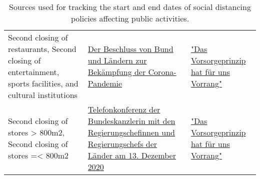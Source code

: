\begin{table}[hbt!]
{\begin{tabular}{|| L | L | L ||}
Second closing of restaurants, Second closing of entertainment, sports facilities, and cultural institutions & \href{https://www.bundesregierung.de/breg-de/suche/bund-laender-beschluss-1805264}{Der Beschluss von Bund und Ländern zur Bekämpfung der Corona-Pandemie} & \href{https://www.bundesregierung.de/breg-de/suche/bund-laender-beschluss-1841048}{"Das Vorsorgeprinzip hat für uns Vorrang"} \\

Second closing of stores > 800m2, Second closing of stores =< 800m2 & \href{https://www.bundesregierung.de/breg-de/suche/telefonkonferenz-der-bundeskanzlerin-mit-den-regierungschefinnen-und-regierungschefs-der-laender-am-13-dezember-2020-1827392}{Telefonkonferenz der Bundeskanzlerin mit den Regierungschefinnen und Regierungschefs der Länder am 13. Dezember 2020} & \href{https://www.bundesregierung.de/breg-de/suche/bund-laender-beschluss-1841048}{"Das Vorsorgeprinzip hat für uns Vorrang"} \\ [1ex]

 \hline
 \end{tabular}
 }
 \caption{Sources used for tracking the start and end dates of social distancing policies affecting public activities.}
\label{table:4}
\end{table}